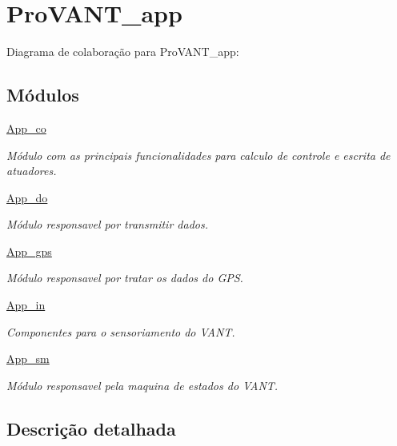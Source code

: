 \hypertarget{group__ProVANT__app}{\section{Pro\-V\-A\-N\-T\-\_\-app}
\label{group__ProVANT__app}
}
Diagrama de colaboração para Pro\-V\-A\-N\-T\-\_\-app\-:
\subsection*{Módulos}
\begin{DoxyCompactItemize}
\item 
\hyperlink{group__app__co}{App\-\_\-co}
\begin{DoxyCompactList}\small\item\em Módulo com as principais funcionalidades para calculo de controle e escrita de atuadores. \end{DoxyCompactList}\item 
\hyperlink{group__app__do}{App\-\_\-do}
\begin{DoxyCompactList}\small\item\em Módulo responsavel por transmitir dados. \end{DoxyCompactList}\item 
\hyperlink{group__app__gps}{App\-\_\-gps}
\begin{DoxyCompactList}\small\item\em Módulo responsavel por tratar os dados do G\-P\-S. \end{DoxyCompactList}\item 
\hyperlink{group__app__in}{App\-\_\-in}
\begin{DoxyCompactList}\small\item\em Componentes para o sensoriamento do V\-A\-N\-T. \end{DoxyCompactList}\item 
\hyperlink{group__app__sm}{App\-\_\-sm}
\begin{DoxyCompactList}\small\item\em Módulo responsavel pela maquina de estados do V\-A\-N\-T. \end{DoxyCompactList}\end{DoxyCompactItemize}


\subsection{Descrição detalhada}
